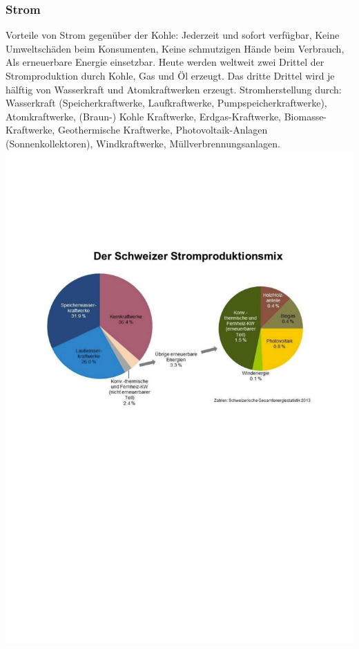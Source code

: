 \documentclass[10pt, openright=true]{scrartcl}
\begin{document}
\subsubsection{Strom}
Vorteile von Strom gegenüber der Kohle: Jederzeit und sofort verfügbar, Keine Umweltschäden beim Konsumenten, Keine schmutzigen Hände beim Verbrauch, Als erneuerbare Energie einsetzbar. Heute werden weltweit zwei Drittel der
Stromproduktion durch Kohle, Gas und Öl erzeugt. Das dritte Drittel wird je hälftig von Wasserkraft und Atomkraftwerken erzeugt. Stromherstellung durch: Wasserkraft (Speicherkraftwerke, Laufkraftwerke, Pumpspeicherkraftwerke), Atomkraftwerke, (Braun-) Kohle Kraftwerke, Erdgas-Kraftwerke, Biomasse-Kraftwerke, Geothermische Kraftwerke, Photovoltaik-Anlagen (Sonnenkollektoren), Windkraftwerke, Müllverbrennungsanlagen.\\
\includegraphics[width=.8\textwidth]{images/strommix}
\end{document}

